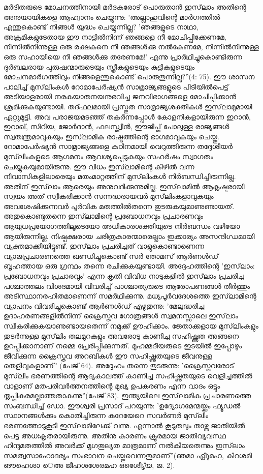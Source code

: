 മര്‍ദിതരുടെ മോചനത്തിനായി മര്‍ദകരോട് പൊരുതാന്‍ ഇസ്‌ലാം അതിന്റെ അനുയായികളെ ആഹ്വാനം ചെയ്യുന്നു: 'അല്ലാഹുവിന്റെ മാര്‍ഗത്തില്‍ എന്തുകൊണ്ട് നിങ്ങള്‍ യുദ്ധം ചെയ്യുന്നില്ല? 'ഞങ്ങളുടെ നാഥാ, അക്രമികളുടേതായ ഈ നാട്ടില്‍നിന്ന് ഞങ്ങളെ നീ മോചിപ്പിക്കേണമേ, നിന്നില്‍നിന്നുള്ള ഒരു രക്ഷകനെ നീ ഞങ്ങള്‍ക്കു നല്‍കേണമേ, നിന്നില്‍നിന്നുള്ള ഒരു സഹായിയെ നീ ഞങ്ങള്‍ക്കു തരേണമേ!' എന്നു പ്രാര്‍ഥിച്ചുകൊണ്ടിരുന്ന ദുര്‍ബലരായ പുരുഷന്മാരുടെയും സ്ത്രീകളുടെയും കുട്ടികളുടെയും മോചനമാര്‍ഗത്തിലും നിങ്ങളെന്തുകൊണ്ട് പൊരുതുന്നില്ല?''(4: 75).
ഈ ശാസന പാലിച്ച് മുസ്‌ലിംകള്‍ റോമാപേര്‍ഷ്യന്‍ സാമ്രാജ്യങ്ങളുടെ പിടിയില്‍പെട്ട് അടിയാളരായി നരകയാതനയനുഭവിച്ച ജനവിഭാഗങ്ങളെ മോചിപ്പിക്കാന്‍ ശ്രമിക്കുകയുണ്ടായി. തദ്ഫലമായി പ്രസ്തുത സാമ്രാജ്യശക്തികള്‍ ഇസ്‌ലാമുമായി ഏറ്റുമുട്ടി. അവ പരാജയമടഞ്ഞ് തകര്‍ന്നപ്പോള്‍ കോളനികളായിരുന്ന ഇറാന്‍, ഇറാഖ്, സിറിയ, ജോര്‍ദാന്‍, ഫലസ്ത്വീന്‍, ഈജിപ്ത് പോലുള്ള രാജ്യങ്ങള്‍ സ്വതന്ത്രമാവുകയും ഇസ്‌ലാമിക രാഷ്ട്രത്തിന്റെ ഭാഗമാവുകയും ചെയ്തു. റോമാപേര്‍ഷ്യന്‍ സാമ്രാജ്യങ്ങളെ കഠിനമായി വെറുത്തിരുന്ന തദ്ദേശീയര്‍ മുസ്‌ലിംകളുടെ ആഗമനം ആവശ്യപ്പെടുകയും സഹര്‍ഷം സ്വാഗതം ചെയ്യുകയുമായിരുന്നു. ഈ വിധം ഇസ്‌ലാമിന്റെ കീഴില്‍ വന്ന നിവാസികളിലാരെയും മതംമാറ്റത്തിന് മുസ്‌ലിംകള്‍ നിര്‍ബന്ധിച്ചിരുന്നില്ല. അതിന് ഇസ്‌ലാം ആരെയും അനുവദിക്കുന്നുമില്ല.
ഇസ്‌ലാമില്‍ ആകൃഷ്ടരായി സ്വയം അത് സ്വീകരിക്കാന്‍ സന്നദ്ധരായവര്‍ മുസ്‌ലിംകളാവുകയും അവശേഷിക്കുന്നവര്‍ പൂര്‍വിക മതത്തില്‍തന്നെ തുടരുകയുമാണുണ്ടായത്. അതുകൊണ്ടുതന്നെ ഇസ്‌ലാമിന്റെ പ്രബോധനവും പ്രചാരണവും ആയുധപ്രയോഗത്തിലൂടെയോ അധികാരശക്തിയുടെ നിര്‍ബന്ധം വഴിയോ ആയിരുന്നില്ല. നിഷ്പക്ഷരായ ചരിത്രകാരന്മാരെല്ലാം ഇക്കാര്യം അസന്ദിഗ്ധമായി വ്യക്തമാക്കിയിട്ടുണ്ട്. ഇസ്‌ലാം പ്രചരിച്ചത് വാളുകൊണ്ടാണെന്ന വ്യാജപ്രചാരണത്തെ ഖണ്ഡിച്ചുകൊണ്ട് സര്‍ തോമസ് ആര്‍ണള്‍ഡ് ബൃഹത്തായ ഒരു ഗ്രന്ഥം തന്നെ രചിക്കുകയുണ്ടായി. അദ്ദേഹത്തിന്റെ 'ഇസ്‌ലാം: പ്രബോധനവും പ്രചാരവും' എന്ന കൃതി വിവിധ നാടുകളില്‍ ഇസ്‌ലാം പ്രചരിച്ച പശ്ചാത്തലം വിശദമായി വിവരിച്ച് പാശ്ചാത്യരുടെ ആരോപണങ്ങള്‍ തീര്‍ത്തും അടിസ്ഥാനരഹിതമാണെന്ന് സമര്‍ഥിക്കുന്നു. മധ്യപൂര്‍വദേശത്തെ ഇസ്‌ലാമിന്റെ വ്യാപനം വിവരിച്ചുകൊണ്ട് ആര്‍ണള്‍ഡ് എഴുതുന്നു: 'മേലുദ്ധരിച്ച ഉദാഹരണങ്ങളില്‍നിന്ന് ക്രൈസ്തവ ഗോത്രങ്ങള്‍ സ്വമനസ്സാലെ ഇസ്‌ലാം സ്വീകരിക്കുകയാണുണ്ടായതെന്ന് നമുക്ക് ഊഹിക്കാം. ജേതാക്കളായ മുസ്‌ലിംകളും തുടര്‍ന്നുള്ള മുസ്‌ലിം തലമുറകളും അവരോടു കാണിച്ച സഹിഷ്ണുത അങ്ങനെ ഉറപ്പിക്കാനാണ് നമ്മെ പ്രേരിപ്പിക്കുന്നത്. മുഹമ്മദീയരുടെ ഇടയില്‍ ഇപ്പോഴും ജീവിക്കുന്ന ക്രൈസ്തവ അറബികള്‍ ഈ സഹിഷ്ണുതയുടെ ജീവനുള്ള തെളിവുകളാണ്'' (പേജ് 64). അദ്ദേഹം തന്നെ തുടരുന്നു: 'ക്രൈസ്തവരോട് മുസ്‌ലിം ഭരണത്തിന്റെ ആദ്യകാലത്ത് കാണിച്ച സഹിഷ്ണുതയുടെ വെളിച്ചത്തില്‍ വാളാണ് മതപരിവര്‍ത്തനത്തിന്റെ മുഖ്യ ഉപകരണം എന്ന വാദം ഒട്ടും തൃപ്തികരമല്ലാത്തതാകുന്നു''(പേജ് 83).
ഇന്ത്യയിലെ ഇസ്‌ലാമിക പ്രചാരണത്തെ സംബന്ധിച്ച് ഡോ. ഈശ്വരി പ്രസാദ് പറയുന്നു: 'ഉദ്യോഗമേന്മയ്ക്കും ഫ്യൂഡല്‍ സ്ഥാനങ്ങള്‍ക്കും കൊതിച്ചിരുന്ന കുറേയേറെ സവര്‍ണര്‍ മുസ്‌ലിം ഭരണത്തോടുകൂടി ഇസ്‌ലാമിലേക്ക് വന്നു. എന്നാല്‍ കൂടുതലും താഴ്ന്ന ജാതിയില്‍ പെട്ട അധഃകൃതരായിരുന്നു. അതിനു കാരണം ക്രൂരമായ ജാതിവ്യവസ്ഥ ഹിന്ദുമതത്തില്‍ അവര്‍ക്ക് മൃഗതുല്യത മാത്രമാണ് നല്‍കിയതെന്നും ഇസ്‌ലാം സമത്വസാഹോദര്യം സംഭാവന ചെയ്തുവെന്നതുമാണ്''(ഞമാ ഏീുമഹ, കിറശമി ങൗഹെശാ െഅ ജീഹശശേരമഹ ഒശേെീൃ്യ, ജ. 2).
